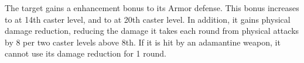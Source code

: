 \begin{spellheader}
    \begin{spelltargetinginfo}
    \end{spelltargetinginfo}
    \begin{spelleffects}
    \end{spelleffects}
\end{spellheader}
\begin{spellcontent}
    \spelleffect The target gains a  enhancement bonus to its Armor defense. This bonus increases to  at 14th caster level, and to  at 20th caster level. In addition, it gains physical damage reduction, reducing the damage it takes each round from physical attacks by 8  per two caster levels above 8th. If it is hit by an adamantine weapon, it cannot use its damage reduction for 1 round.
    \spelldur{\durshort}
\end{spellcontent}
\begin{spellfooter}

\end{spellfooter}

